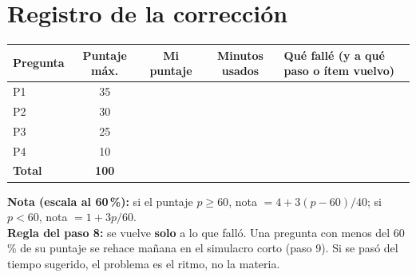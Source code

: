 \documentclass[11pt,a4paper]{article}
\begin{document}
\section*{Registro de la corrección}
\begin{center}\small
\renewcommand{\arraystretch}{1.5}
\begin{tabular}{|l|c|c|c|p{7.2cm}|}\hline
Pregunta & Puntaje máx. & Mi puntaje & Minutos usados & Qué fallé (y a qué paso o ítem vuelvo)\\\hline
P1 & 35 & & & \\\hline
P2 & 30 & & & \\\hline
P3 & 25 & & & \\\hline
P4 & 10 & & & \\\hline
\textbf{Total} & \textbf{100} & & & \\\hline
\end{tabular}
\end{center}
\textbf{Nota (escala al 60\,\%):} si el puntaje $p\ge60$, nota $=4+3(p-60)/40$; si $p<60$, nota $=1+3p/60$.\\
\textbf{Regla del paso 8:} se vuelve \textbf{solo} a lo que falló. Una pregunta con menos del 60\,\% de su puntaje se rehace mañana en el simulacro corto (paso 9). Si se pasó del tiempo sugerido, el problema es el ritmo, no la materia.
\end{document}
